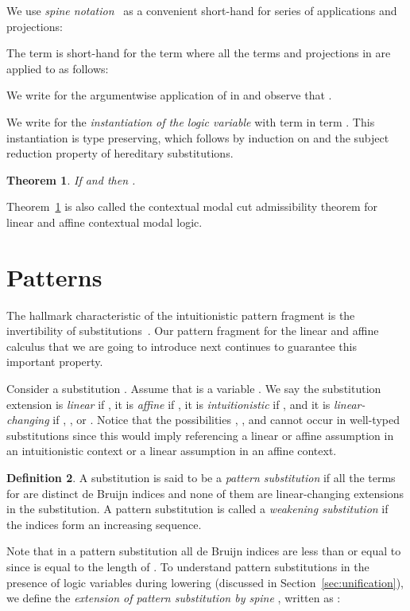 \documentclass{eptcs}
\newtheorem{thm}{Theorem}[section]
\theoremstyle{definition}
\newtheorem{defin}[thm]{Definition}
\begin{document}
We use \emph{spine notation}~\cite{Cervesato03jlc} as a convenient short-hand for series of
applications and projections:

The term  is short-hand for the term where all the terms and
projections in  are applied to  as follows:

We write  for the argumentwise application of  in  and observe
that .

We write  for the \emph{instantiation of the logic variable}  with term  in
term .  This instantiation is type preserving, which follows 
by induction on  and the subject reduction property of hereditary substitutions.
\begin{thm}\label{thm:modalcut}
If  and  then
.
\end{thm}
Theorem~\ref{thm:modalcut} is also called the contextual modal cut
admissibility theorem for linear and affine contextual modal logic.


\section{Patterns}\label{sec:inversion}
The hallmark characteristic of the intuitionistic pattern fragment is
the invertibility of substitutions~\cite{Dowek98tr}.  Our pattern
fragment for the linear and affine calculus that we are going to
introduce next continues to guarantee this important property.  


Consider a substitution
.
Assume that  is a variable .  We say the
substitution extension
 is
\emph{linear} if
, it is \emph{affine} if 
, it is \emph{intuitionistic} if 
, and it is \emph{linear-changing} if 
, , or .
Notice that the possibilities , , and 
cannot occur in well-typed substitutions since this would imply
referencing a linear or affine assumption in an intuitionistic context or
a linear assumption in an affine context.


\begin{defin} \label{def:patsub}
A substitution 
is said to be a \emph{pattern substitution} if all the terms  for
 are distinct de Bruijn indices and none of them
are linear-changing extensions in the substitution.
A pattern substitution is called a \emph{weakening substitution} if the
indices  form an increasing sequence.
\end{defin}

Note that in a pattern substitution all de Bruijn indices are less than or equal to  since  is
equal to the length of .   To understand pattern
substitutions in the presence of logic variables during
lowering (discussed in Section~\ref{sec:unification}), we define the
\emph{extension of pattern substitution  by spine }, written as :
\end{document}
